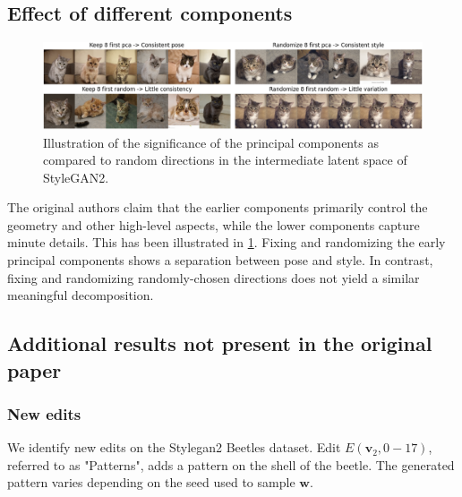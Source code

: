 \documentclass{article}
\begin{document}
\subsection{Effect of different components}

\begin{figure}[H]
    \centering
    \includegraphics[width=\textwidth]{figs/figure4_randomize_8_first_random-little_variation.png}
    \caption{Illustration of the significance of the principal components as compared to random directions in the intermediate latent space of StyleGAN2.}
    \label{fig:cats}
\end{figure}

The original authors claim that the earlier components primarily control the geometry and other high-level aspects, while the lower components capture minute details. This has been illustrated in \ref{fig:cats}. Fixing and randomizing the early principal components shows a separation between pose and style. In contrast, fixing and randomizing randomly-chosen directions does not yield a similar meaningful decomposition.

\subsection{Additional results not present in the original paper}

\subsubsection{New edits}

We identify new edits on the Stylegan2 Beetles dataset. Edit $E(\textbf{v}_{2}, 0-17)$, referred to as "Patterns", adds a pattern on the shell of the beetle. The generated pattern varies depending on the seed used to sample $\textbf{w}$.
\end{document}
